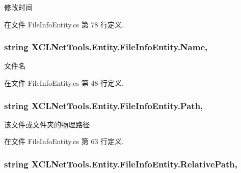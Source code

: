 修改时间 



在文件 File\-Info\-Entity.\-cs 第 78 行定义.

\hypertarget{class_x_c_l_net_tools_1_1_entity_1_1_file_info_entity_a15a2bb6c738c32250f00604b6636cae4}{
\subsubsection[{Name}]{\setlength{\rightskip}{0pt plus 5cm}string X\-C\-L\-Net\-Tools.\-Entity.\-File\-Info\-Entity.\-Name\hspace{0.3cm}{\ttfamily [get]}, {\ttfamily [set]}}}\label{class_x_c_l_net_tools_1_1_entity_1_1_file_info_entity_a15a2bb6c738c32250f00604b6636cae4}


文件名 



在文件 File\-Info\-Entity.\-cs 第 48 行定义.

\hypertarget{class_x_c_l_net_tools_1_1_entity_1_1_file_info_entity_a67f485c1a1af6205351305756d515e98}{
\subsubsection[{Path}]{\setlength{\rightskip}{0pt plus 5cm}string X\-C\-L\-Net\-Tools.\-Entity.\-File\-Info\-Entity.\-Path\hspace{0.3cm}{\ttfamily [get]}, {\ttfamily [set]}}}\label{class_x_c_l_net_tools_1_1_entity_1_1_file_info_entity_a67f485c1a1af6205351305756d515e98}


该文件或文件夹的物理路径 



在文件 File\-Info\-Entity.\-cs 第 63 行定义.

\hypertarget{class_x_c_l_net_tools_1_1_entity_1_1_file_info_entity_a795982d186fa2d1ef0e3fb51705f36b2}{
\subsubsection[{Relative\-Path}]{\setlength{\rightskip}{0pt plus 5cm}string X\-C\-L\-Net\-Tools.\-Entity.\-File\-Info\-Entity.\-Relative\-Path\hspace{0.3cm}{\ttfamily [get]}, {\ttfamily [set]}}}\label{class_x_c_l_net_tools_1_1_entity_1_1_file_info_entity_a795982d186fa2d1ef0e3fb51705f36b2}


